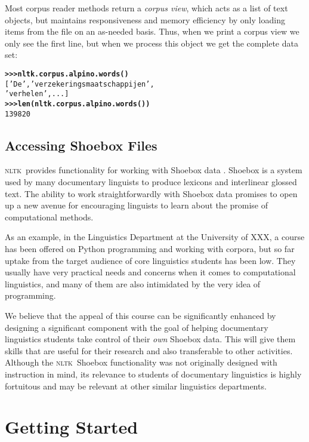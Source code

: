\documentclass[11pt]{article}
\newcommand{\NLTK}{\textsc{nltk}}
\begin{document}
Most corpus reader methods return a \emph{corpus view}, which acts as
a list of text objects, but maintains responsiveness and memory
efficiency by only loading items from the file on an as-needed basis.
Thus, when we print a corpus view we only see the first line, but when
we process this object we get the complete data set:

{\footnotesize
\begin{alltt}
\textbf{>>> nltk.corpus.alpino.words()}
['De', 'verzekeringsmaatschappijen',
'verhelen', ...]
\textbf{>>> len(nltk.corpus.alpino.words())}
139820
\end{alltt}}

\subsection{Accessing Shoebox Files}

\NLTK\ provides functionality for working with Shoebox data
\cite{robinson:etal:2007}. Shoebox is a system used by many
documentary linguists to produce lexicons and interlinear glossed text.  The
ability to work straightforwardly with Shoebox data promises to open
up a new avenue for encouraging linguists to learn about the promise
of computational methods. 

As an example, in the Linguistics Department at the University of
XXX, a course has been offered on Python programming and
working with corpora, but so far uptake from the
target audience of core linguistics students has been low. They usually have very
practical needs and concerns when it comes to computational
linguistics, and many of them are also intimidated by the very idea of
programming. %

We believe that the appeal of this course can be significantly
enhanced by designing a significant component
with the goal of helping documentary linguistics students take control of their
\emph{own} Shoebox data. This will give them  skills that are
useful for their research and also transferable to other activities.
Although the \NLTK\ Shoebox functionality was not
originally designed with instruction in mind, its relevance to
students of documentary linguistics is highly fortuitous and
may be relevant at other similar linguistics departments.

\section{Getting Started}
\label{sec:getting-started}
\end{document}
